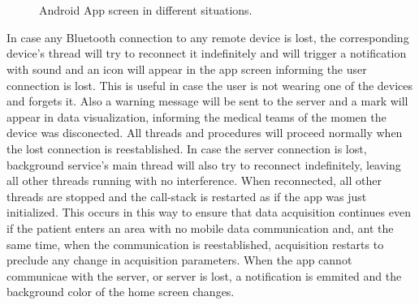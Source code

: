 \begin{figure}[!t]
	\centering
	\\
	\\
	\caption{Android App screen in different situations.}
	\label{fig:app}
\end{figure}

In case any Bluetooth connection to any remote device is lost, the corresponding device's thread will try to reconnect it indefinitely and will trigger a notification with sound and an icon will appear in the app screen informing the user connection is lost. This is useful in case the user is not wearing one of the devices and forgets it. Also a warning message will be sent to the server and a mark will appear in data visualization, informing the medical teams of the momen the device was disconected. All threads and procedures will proceed normally when the lost connection is reestablished. In case the server connection is lost, background service's main thread will also try to reconnect indefinitely, leaving all other threads running with no interference. When reconnected, all other threads are stopped and the call-stack is restarted as if the app was just initialized. This occurs in this way to ensure that data acquisition continues even if the patient enters an area with no mobile data communication and, ant the same time, when the communication is reestablished, acquisition restarts to preclude any change in acquisition parameters. When the app cannot communicae with the server, or server is lost, a notification is emmited and the background color of the home screen changes.



